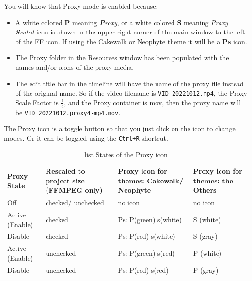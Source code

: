 You will know that Proxy mode is enabled because:
\begin{itemize}
	\item A white colored \textbf{P} meaning \textit{\textbf{P}roxy}, or a white colored \textbf{S} meaning \textit{Proxy \textbf{S}caled} icon is shown in the upper right corner of the main window to the left of the FF icon.  If using the Cakewalk or Neophyte theme it will be a \textbf{Ps} icon.
	\item  The Proxy folder in the Resources window has been populated with the names and/or icons of the proxy media.
	\item The edit title bar in the timeline will have the name of the proxy file instead of the original name. So if the video filename is \texttt{VID\_20221012.mp4}, the Proxy Scale Factor is $\frac{1}{4}$, and the Proxy container is mov, then the proxy name will be \texttt{VID\_20221012.proxy4-mp4.mov}.
\end{itemize}

The Proxy icon is a toggle button so that you just click on the icon to change modes.  Or it can be toggled using the \texttt{Ctrl+R} shortcut. 

\begin{table}[ht]
	\centering
	\begin{tabular}{|p{2.5cm}|p{3.2cm}|p{3.2cm}|p{3.2cm}|}
		\hline
		{\footnotesize\textbf{Proxy State}} & 	{\footnotesize\textbf{Rescaled to project size (FFMPEG only)}} & 	{\footnotesize\textbf{Proxy icon for themes:
		Cakewalk/ Neophyte}} & 	{\footnotesize\textbf{Proxy icon for themes: the Others}}\\
		\hline
		{\footnotesize{Off}} & {\footnotesize{checked/ unchecked}} & {\footnotesize{no icon}}
		 & {\footnotesize{no icon}}\\
		\hline
		{\footnotesize{Active (Enable)}} & {\footnotesize{checked}} & {\footnotesize{Ps: P(green)  s(white)}}
		 & {\footnotesize{S (white)}}\\
		\hline
		{\footnotesize{Disable}} & {\footnotesize{checked}} & {\footnotesize{Ps: P(red)  s(white)}} & {\footnotesize{S (gray)}}\\
		\hline
		{\footnotesize{Active (Enable)}} & {\footnotesize{unchecked}} & {\footnotesize{Ps: P(green) s(red)}} & {\footnotesize{P (white)}}\\
		\hline
		{\footnotesize{Disable}} & {\footnotesize{unchecked}} & {\footnotesize{Ps: P(red) s(red)}} & {\footnotesize{P (gray)}}\\
		\hline
	\end{tabular}
	\caption{list States of the Proxy icon}
\end{table}


